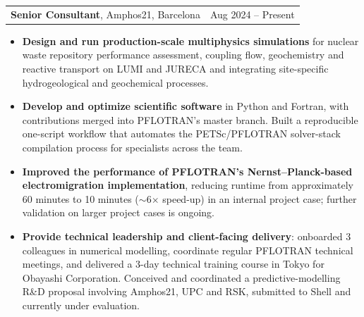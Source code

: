 \documentclass[10pt,a4paper]{article}
\makeatletter
\newcommand{\dates}[1]{{\sffamily\fontsize{8.8}{10.5}\selectfont\color{muted}#1}}
\newcommand{\org}[1]{{\color{ink}\textbf{#1}}}
\newcommand{\role}[3]{%
  \begin{tabularx}{\textwidth}{@{}X r@{}}
    \org{#1}, #2 & \dates{#3} \\
  \end{tabularx}%
  \vspace{-1.2pt}}
\makeatother
\begin{document}
\role{Senior Consultant}{Amphos21, Barcelona}{Aug 2024 -- Present}
\begin{itemize}
	
%	
%	

\item \org{Design and run production-scale multiphysics simulations}
for nuclear waste repository performance assessment, coupling flow,
geochemistry and reactive transport on LUMI and JURECA and integrating
site-specific hydrogeological and geochemical processes.

\item \org{Develop and optimize scientific software} in Python and Fortran,
with contributions merged into PFLOTRAN's master branch. Built a reproducible
one-script workflow that automates the PETSc/PFLOTRAN solver-stack compilation
process for specialists across the team.

\item \org{Improved the performance of PFLOTRAN's Nernst--Planck-based
	electromigration implementation}, reducing runtime from approximately
60 minutes to 10 minutes ($\sim$6$\times$ speed-up) in an internal project
case; further validation on larger project cases is ongoing.

\item \org{Provide technical leadership and client-facing delivery}:
onboarded 3 colleagues in numerical modelling, coordinate regular PFLOTRAN
technical meetings, and delivered a 3-day technical training course in
Tokyo for Obayashi Corporation. Conceived and coordinated a predictive-modelling R\&D
proposal involving Amphos21, UPC and RSK, submitted to Shell and currently
under evaluation.

	
\end{itemize}
\end{document}
